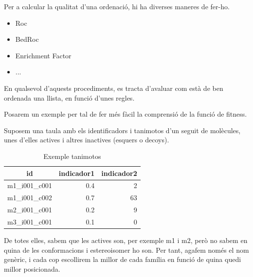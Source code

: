 Per a calcular la qualitat d'una ordenació, hi ha diverses maneres de fer-ho.

\begin{itemize}
	\item Roc
	\item BedRoc
	\item Enrichment Factor
	\item ...
\end{itemize}


En qualsevol d'aquests procediments, es tracta d'avaluar com està de ben ordenada una llista, en funció d'unes regles.

Posarem un exemple per tal de fer més fàcil la comprensió de la funció de
fitness.

Suposem una taula amb els identificadors i tanimotos d'un seguit de molècules,
unes d'elles actives i altres inactives (esquers o decoys).



\begin{table}
\centering
\begin{tabular}{|l|r|r|}
\hline
\multicolumn{1}{|c|}{\textbf{id }} & \multicolumn{1}{c|}{\textbf{ indicador1 }} & \multicolumn{1}{c|}{\textbf{ indicador2}} \\
\hline
\hline
m1\_i001\_c001 & 0.4 & 2  \\
m1\_i001\_c002 & 0.7 & 63 \\
m2\_i001\_c001 & 0.2 & 9  \\
m3\_i001\_c001 & 0.1 & 0  \\
\hline
\end{tabular}
\caption{Exemple tanimotos}
\end{table}

De totes elles, sabem que les actives son, per exemple m1 i m2, però no sabem
en quina de les conformacions i estereoisomer ho son.  Per tant, agafem només el
nom genèric, i cada cop escollirem la millor de cada família en funció de quina
quedi millor posicionada.

